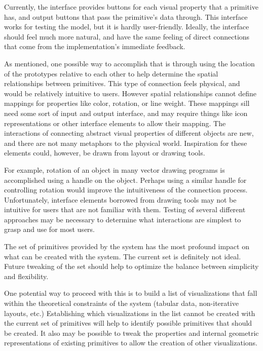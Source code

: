 \label{primConnectionsFW}
Currently, the interface provides buttons for each visual property that a primitive has, and output buttons that pass the primitive's data through.
This interface works for testing the model, but it is hardly user-friendly.
Ideally, the interface should feel much more natural, and have the same feeling of direct connections that come from the implementation's immediate feedback.

As mentioned, one possible way to accomplish that is through using the location of the prototypes relative to each other to help determine the spatial relationships between primitives.
This type of connection feels physical, and would be relatively intuitive to users.
However spatial relationships cannot define mappings for properties like color, rotation, or line weight.
These mappings sill need some sort of input and output interface, and may require things like icon representations or other interface elements to allow their mapping.
The interactions of connecting abstract visual properties of different objects are new, and there are not many metaphors to the physical world.
Inspiration for these elements could, however, be drawn from layout or drawing tools.

For example, rotation of an object in many vector drawing programs is accomplished using a handle on the object.
Perhaps using a similar handle for controlling rotation would improve the intuitiveness of the connection process.
Unfortunately, interface elements borrowed from drawing tools may not be intuitive for users that are not familiar with them.
Testing of several different approaches may be necessary to determine what interactions are simplest to grasp and use for most users.

\label{setPrimitivesFW}
The set of primitives provided by the system has the most profound impact on what can be created with the system.
The current set is definitely not ideal.
Future tweaking of the set should help to optimize the balance between simplicity and flexibility.

One potential way to proceed with this is to build a list of visualizations that fall within the theoretical constraints of the system (tabular data, non-iterative layouts, etc.)
Establishing which visualizations in the list cannot be created with the current set of primitives will help to identify possible primitives that should be created.
It also may be possible to tweak the properties and internal geometric representations of existing primitives to allow the creation of other visualizations.

